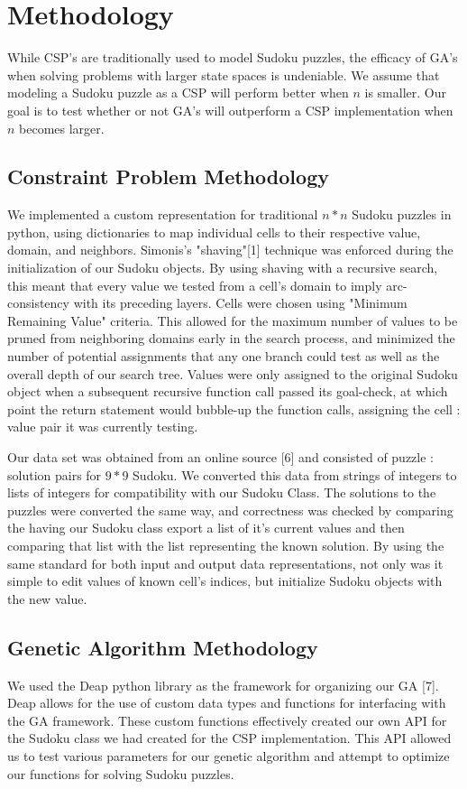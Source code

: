 \documentclass[12pt, conference]{IEEEtran}
\begin{document}
\section{Methodology}

While CSP's are traditionally used to model Sudoku puzzles, the efficacy of GA's when solving problems with larger state spaces is undeniable.
We assume that modeling a Sudoku puzzle as a CSP will perform better when $n$ is smaller.
Our goal is to test whether or not GA's will outperform a CSP implementation when $n$ becomes larger.

\subsection{Constraint Problem Methodology}
We implemented a custom representation for traditional ${n*n}$ Sudoku puzzles in python, using dictionaries to map individual cells to their respective value, domain, and neighbors.
Simonis's "shaving"[1] technique was enforced during the initialization of our Sudoku objects.
By using shaving with a recursive search, this meant that every value we tested from a cell's domain to imply arc-consistency with its preceding layers.
Cells were chosen using "Minimum Remaining Value" criteria.
This allowed for the maximum number of values to be pruned from neighboring domains early in the search process, and minimized the number of potential assignments that any one branch could test as well as the overall depth of our search tree.
Values were only assigned to the original Sudoku object when a subsequent recursive function call passed its goal-check, at which point the return statement would bubble-up the function calls, assigning the cell : value pair it was currently testing.

\par
Our data set was obtained from an online source [6] and consisted of puzzle : solution pairs for ${9*9}$ Sudoku.
We converted this data from strings of integers to lists of integers for compatibility with our Sudoku Class.
The solutions to the puzzles were converted the same way, and correctness was checked by comparing the having our Sudoku class export a list of it's current values and then comparing that list with the list representing the known solution.
By using the same standard for both input and output data representations, not only was it simple to edit values of known cell's indices, but initialize Sudoku objects with the new value.

\subsection{Genetic Algorithm Methodology}
We used the Deap python library as the framework for organizing our GA [7].
Deap allows for the use of custom data types and functions for interfacing with the GA framework.
These custom functions effectively created our own API for the Sudoku class we had created for the CSP implementation.
This API allowed us to test various parameters for our genetic algorithm and attempt to optimize our functions for solving Sudoku puzzles.
\end{document}

